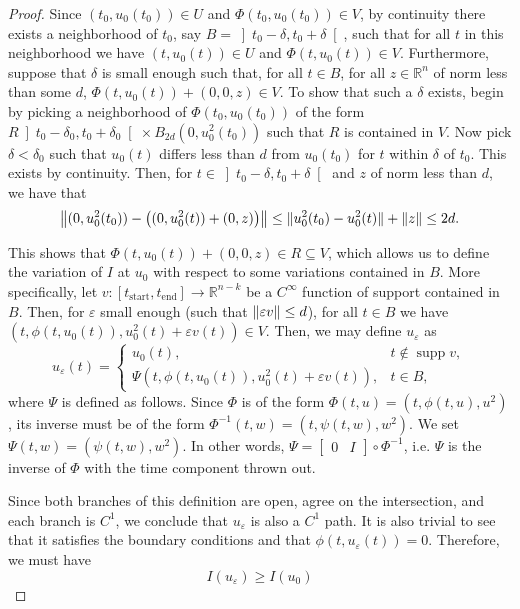 \documentclass{article}
\theoremstyle{plain}
\theoremstyle{plain}
\theoremstyle{nonumberplain}
\newtheorem{proof}{Proof}
\theoremstyle{empty}
\newcommand{\R}{\mathbb{R}}
\newcommand{\tstart}{\mathrm{start}}
\newcommand{\tend}{\mathrm{end}}
\DeclarePairedDelimiter\norm{\lVert}{\rVert}
\DeclareMathOperator{\supp}{supp}
\begin{document}
\begin{proof}
Since $(t_0, u_0(t_0)) \in U$ and $\Phi(t_0, u_0(t_0)) \in V$, by continuity there exists a neighborhood of $t_0$, say $B = \left]t_0 - \delta, t_0 + \delta\right[$, such that for all $t$ in this neighborhood we have $(t,u_0(t)) \in U$ and $\Phi(t,u_0(t)) \in V$. Furthermore, suppose that $\delta$ is small enough such that, for all $t \in B$, for all $z \in \R^{n}$ of norm less than some $d$, $\Phi(t,u_0(t)) + (0,0,z) \in V$. To show that such a $\delta$ exists, begin by picking a neighborhood of $\Phi(t_0, u_0(t_0))$ of the form $R \left]t_0-\delta_0, t_0 + \delta_0\right[ \times B_{2d}(0, u_0^2(t_0))$ such that $R$ is contained in $V$. Now pick $\delta < \delta_0$ such that $u_0(t)$ differs less than $d$ from $u_0(t_0)$ for $t$ within $\delta$ of $t_0$. This exists by continuity. Then, for $t \in \left]t_0-\delta, t_0 + \delta\right[$ and $z$ of norm less than $d$, we have that
\[\norm*{(0, u_0^2(t_0)) - \left((0, u_0^2(t)) + (0, z)\right)} \leq \norm{u_0^2(t_0) - u_0^2(t)} + \norm z \leq 2d.\]

This shows that $\Phi(t,u_0(t)) + (0,0,z) \in R \subseteq V$, which allows us to define the variation of $I$ at $u_0$ with respect to some variations contained in $B$. More specifically, let $v : [t_\tstart, t_\tend] \to \R^{n-k}$ be a $C^\infty$ function of support contained in $B$. Then, for $\varepsilon$ small enough (such that $\norm{\varepsilon v} \leq d$), for all $t \in B$ we have $(t, \phi(t,u_0(t)), u_0^2(t) + \varepsilon v(t)) \in V$. Then, we may define $u_\varepsilon$ as
\[
u_\varepsilon(t) =
\begin{cases}
u_0(t), & t \not \in \supp v,\\
\Psi(t, \phi(t,u_0(t)), u_0^2(t) + \varepsilon v(t)), & t \in B,
\end{cases}
\]
where $\Psi$ is defined as follows. Since $\Phi$ is of the form $\Phi(t,u) = (t, \phi(t,u), u^2)$, its inverse must be of the form $\Phi^{-1}(t,w) = (t, \psi(t,w), w^2)$. We set $\Psi(t,w) = (\psi(t,w), w^2)$. In other words, $\Psi = \begin{bmatrix} 0 & I \end{bmatrix} \circ \Phi^{-1}$, i.e. $\Psi$ is the inverse of $\Phi$ with the time component thrown out.

Since both branches of this definition are open, agree on the intersection, and each branch is $C^1$, we conclude that $u_\varepsilon$ is also a $C^1$ path. It is also trivial to see that it satisfies the boundary conditions and that $\phi(t, u_\varepsilon(t)) = 0$. Therefore, we must have
\[I(u_\varepsilon) \geq I(u_0)\]


\end{proof}
\end{document}
